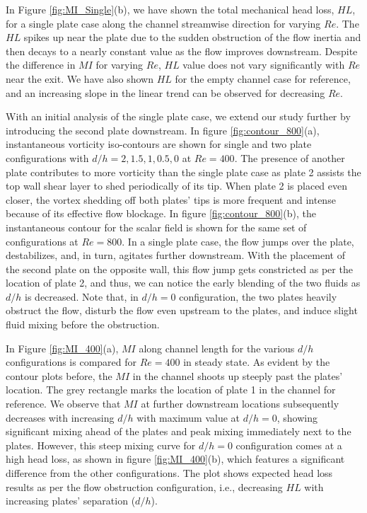 \documentclass[reprint,a4paper,fleqn]{cas-dc} %
\begin{document}
		In Figure \ref{fig:MI_Single}(b), we have shown the total mechanical head loss, $HL$, for a single plate case along the channel streamwise direction for varying $Re$. The $HL$ spikes up near the plate due to the sudden obstruction of the flow inertia and then decays to a nearly constant value as the flow improves downstream. Despite the difference in $MI$ for varying $Re$, $HL$ value does not vary significantly with $Re$ near the exit. We have also shown $HL$ for the empty channel case for reference, and an increasing slope in the linear trend can be observed for decreasing $Re$.
		
		
		With an initial analysis of the single plate case, we extend our study further by introducing the second plate downstream. In figure \ref{fig:contour_800}(a), instantaneous vorticity iso-contours are shown for single and two plate configurations with $d/h=2,1.5,1,0.5,0$ at $Re=400$. The presence of another plate contributes to more vorticity than the single plate case as plate 2 assists the top wall shear layer to shed periodically of its tip. When plate 2 is placed even closer, the vortex shedding off both plates' tips is more frequent and intense because of its effective flow blockage. In figure  \ref{fig:contour_800}(b), the instantaneous contour for the scalar field is shown for the same set of configurations at $Re=800$. In a single plate case, the flow jumps over the plate, destabilizes, and, in turn, agitates further downstream. With the placement of the second plate on the opposite wall, this flow jump gets constricted as per the location of plate 2, and thus, we can notice the early blending of the two fluids as $d/h$ is decreased. Note that, in $d/h=0$ configuration, the two plates heavily obstruct the flow, disturb the flow even upstream to the plates, and induce slight fluid mixing before the obstruction.
		
		In Figure \ref{fig:MI_400}(a), $MI$ along channel length for the various $d/h$ configurations is compared for $Re=400$ in steady state. As evident by the contour plots before, the $MI$ in the channel shoots up steeply past the plates' location. The grey rectangle marks the location of plate 1 in the channel for reference. We observe that $MI$ at further downstream locations subsequently decreases with increasing $d/h$ with maximum value at $d/h=0$, showing significant mixing ahead of the plates and peak mixing immediately next to the plates. However, this steep mixing curve for $d/h=0$ configuration comes at a high head loss, as shown in figure \ref{fig:MI_400}(b), which features a significant difference from the other configurations. The plot shows expected head loss results as per the flow obstruction configuration, i.e., decreasing $HL$ with increasing plates' separation ($d/h$).
		
\end{document}
